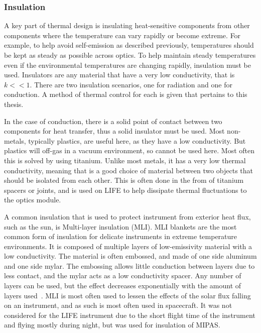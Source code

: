 \subsubsection{Insulation}

A key part of thermal design is insulating heat-sensitive components from other components where the temperature can vary rapidly or become extreme. For example, to help avoid self-emission as described previously, temperatures should be kept as steady as possible across optics. To help maintain steady temperatures even if the environmental temperatures are changing rapidly, insulation must be used. Insulators are any material that have a very low conductivity, that is $k << 1$. There are two insulation scenarios, one for radiation and one for conduction. A method of thermal control for each is given that pertains to this thesis.

In the case of conduction, there is a solid point of contact between two components for heat transfer, thus a solid insulator must be used. Most non-metals, typically plastics, are useful here, as they have a low conductivity. But plastics will off-gas in a vacuum environment, so cannot be used here. Most often this is solved by using titanium. Unlike most metals, it has a very low thermal conductivity, meaning that is a good choice of material between two objects that should be isolated from each other. This is often done in the from of titanium spacers or joints, and is used on LIFE to help dissipate thermal fluctuations to the optics module.

A common insulation that is used to protect instrument from exterior heat flux, such as the sun, is Multi-layer insulation (MLI). MLI blankets are the most common form of insulation for delicate instruments in extreme temperature environments. It is composed of multiple layers of low-emissivity material with a low conductivity. The material is often embossed, and made of one side aluminum and one side mylar. The embossing allows little conduction between layers due to less contact, and the mylar acts as a low conductivity spacer. Any number of layers can be used, but the effect decreases exponentially with the amount of layers used~\citep{SMAD}. MLI is most often used to lessen the effects of the solar flux falling on an instrument, and as such is most often used in spacecraft. It was not considered for the LIFE instrument due to the short flight time of the instrument and flying mostly during night, but was used for insulation of MIPAS.

